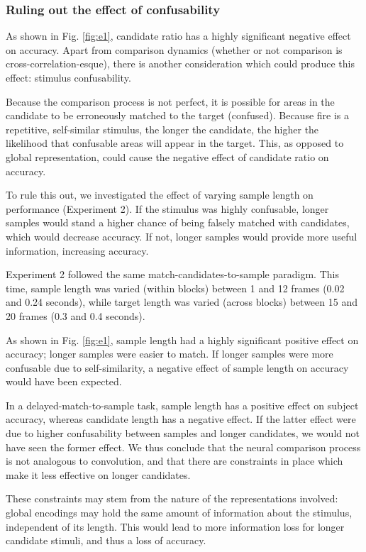 \documentclass[a4paper]{article}
\begin{document}
\subsubsection*{Ruling out the effect of confusability}

As shown in Fig. \ref{fig:e1}, candidate ratio has a highly significant negative effect on accuracy. Apart from comparison dynamics (whether or not comparison is cross-correlation-esque), there is another consideration which could produce this effect: stimulus confusability.

Because the comparison process is not perfect, it is possible for areas in the candidate to be erroneously matched to the target (confused). Because fire is a repetitive, self-similar stimulus, the longer the candidate, the higher the likelihood that confusable areas will appear in the target. This, as opposed to global representation, could cause the negative effect of candidate ratio on accuracy.

To rule this out, we investigated the effect of varying sample length on performance (Experiment 2). If the stimulus was highly confusable, longer samples would stand a higher chance of being falsely matched with candidates, which would decrease accuracy. If not, longer samples would provide more useful information, increasing accuracy.

Experiment 2 followed the same match-candidates-to-sample paradigm. This time, sample length was varied (within blocks) between 1 and 12 frames (0.02 and 0.24 seconds), while target length was varied (across blocks) between 15 and 20 frames (0.3 and 0.4 seconds).

As shown in Fig. \ref{fig:e1}, sample length had a highly significant positive effect on accuracy; longer samples were easier to match. If longer samples were more confusable due to self-similarity, a negative effect of sample length on accuracy would have been expected.

In a delayed-match-to-sample task, sample length has a positive effect on subject accuracy, whereas candidate length has a negative effect. If the latter effect were due to  higher confusability between samples and longer candidates, we would not have seen the former effect. We thus conclude that the neural comparison process is not analogous to convolution, and that there are constraints in place which make it less effective on longer candidates.

These constraints may stem from the nature of the representations involved: global encodings may hold the same amount of information about the stimulus, independent of its length. This would lead to more information loss for longer candidate stimuli, and thus a loss of accuracy.
\end{document}

